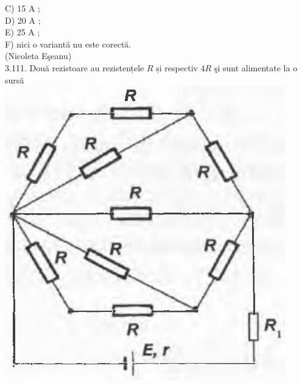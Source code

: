 \documentclass[10pt]{article}
\begin{document}
C) 15 A ;\\
D) 20 A ;\\
E) 25 A ;\\
F) nici o variantă nu este corectă.\\
(Nicoleta Eşeanu)\\
3.111. Două rezistoare au rezistențele $R$ și respectiv $4 R$ şi sunt alimentate la o sursă\\
\includegraphics[max width=\textwidth, center]{2025_07_01_5b3ff9fa0d508c8e9f17g-167}
\end{document}
